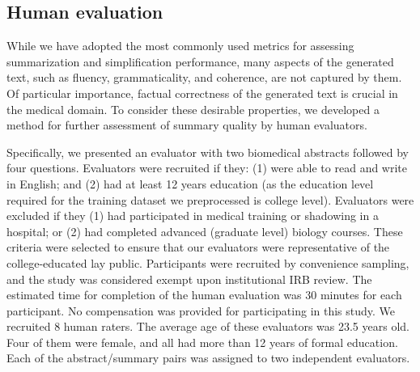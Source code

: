 \documentclass[letterpaper, table]{article} %
\begin{document}
\subsection{Human evaluation}
While we have adopted the most commonly used metrics for assessing summarization and simplification performance, many aspects of the generated text, such as fluency, grammaticality, and coherence, are not captured by them. Of particular importance, factual correctness of the generated text is crucial in the medical domain. To consider these desirable properties, we developed a method for further assessment of summary quality by human evaluators.


Specifically, we presented an evaluator with two biomedical abstracts followed by four questions. Evaluators were recruited if they: (1) were able to read and write in English; and (2) had at least 12 years education (as the education level required for the training dataset we preprocessed is college level). Evaluators were excluded if they (1) had participated in medical training or shadowing in a hospital; or (2) had completed advanced (graduate level) biology courses. These criteria were selected to ensure that our evaluators were representative of the college-educated lay public. Participants were recruited by convenience sampling, and the study was considered exempt upon institutional IRB review. The estimated time for completion of the human evaluation was 30 minutes for each participant. No compensation was provided for participating in this study.  We recruited 8 human raters.
The average age of these evaluators was 23.5 years old. Four of them were female, and all had more than 12 years of formal education. Each of the abstract/summary pairs was assigned to two independent evaluators.
\end{document}
